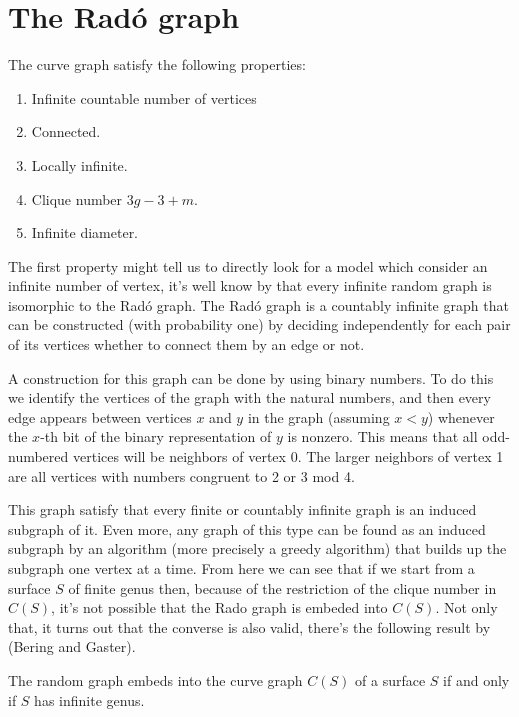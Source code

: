 \section{The Radó graph}

The curve graph satisfy the following properties:

\begin{enumerate}
\item Infinite countable number of vertices
\item Connected.
\item Locally infinite.
\item Clique number $3g-3+m$.
\item Infinite diameter.
\end{enumerate}

The first property might tell us to directly look for a model which consider an infinite number of vertex, it's well know by \cite[Erdös, Rényi]{RadoUnique} that every infinite random graph is isomorphic to the Radó graph. The Radó graph is a countably infinite graph that can be constructed (with probability one) by deciding independently for each pair of its vertices whether to connect them by an edge or not.

A construction for this graph can be done by using binary numbers. To do this we identify the vertices of the graph with the natural numbers, and then every edge appears between vertices $x$ and $y$ in the graph (assuming $x < y$) whenever the $x$-th bit of the binary representation of $y$ is nonzero. This means that all odd-numbered vertices will be neighbors of vertex 0. The larger neighbors of vertex 1 are all vertices with numbers congruent to 2 or 3 mod 4.

This graph satisfy that every finite or countably infinite graph is an induced subgraph of it. Even more, any graph of this type can be found as an induced subgraph by an algorithm (more precisely a greedy algorithm) that builds up the subgraph one vertex at a time. From here we can see that if we start from a surface $S$ of finite genus then, because of the restriction of the clique number in $C(S)$, it's not possible that the Rado graph is embeded into $C(S)$. Not only that, it turns out that the converse is also valid, there's the following result by \cite{} (Bering and Gaster).

\begin{theorem}
The random graph embeds into the curve graph $C(S)$ of a surface $S$ if and only if $S$ has infinite genus.
\end{theorem}

